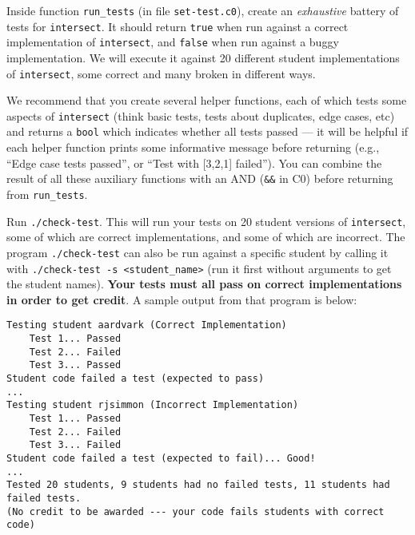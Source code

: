 \begin{part}
  Inside function \lstinline'run_tests' (in file
  \lstinline'set-test.c0'), create an \emph{exhaustive} battery of
  tests for \lstinline'intersect'.  It should return \lstinline'true'
  when run against a correct implementation of \lstinline'intersect',
  and \lstinline'false' when run against a buggy implementation.  We
  will execute it against 20 different student implementations of
  \lstinline'intersect', some correct and many broken in different ways.



We recommend that you create several helper functions, each of which
tests some aspects of \lstinline'intersect' (think basic tests, tests
about duplicates, edge cases, etc) and returns a \lstinline'bool'
which indicates whether all tests passed --- it will be helpful if
each helper function prints some informative message before returning
(e.g., ``Edge case tests passed'', or ``Test with [3,2,1] failed'').
You can combine the result of all these auxiliary functions with an
AND (\lstinline'&&' in C0) before returning from \lstinline'run_tests'.



Run \lstinline'./check-test'.  This will run your tests on 20 student
versions of \lstinline'intersect', some of which are correct
implementations, and some of which are incorrect.  The program
\lstinline'./check-test' can also be run against a specific student by
calling it with \lstinline'./check-test -s <student_name>' (run it
first without arguments to get the student names).  \textbf{Your tests
  must all pass on correct implementations in order to get credit}.  A
sample output from that program is below:

\begin{lstlisting}[language={[coin]C}]
% ./check-test
Testing student aardvark (Correct Implementation)
	Test 1... Passed
	Test 2... Failed
	Test 3... Passed
Student code failed a test (expected to pass)
...
Testing student rjsimmon (Incorrect Implementation)
	Test 1... Passed
	Test 2... Failed
	Test 3... Failed
Student code failed a test (expected to fail)... Good!
...
Tested 20 students, 9 students had no failed tests, 11 students had failed tests.
(No credit to be awarded --- your code fails students with correct code)
\end{lstlisting}
\end{part}

